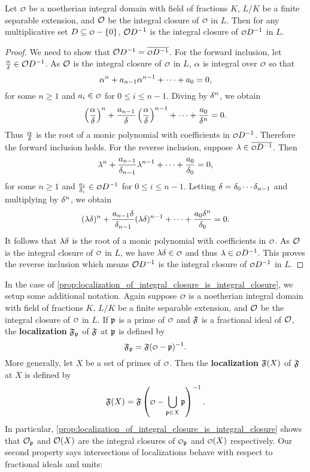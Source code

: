     \begin{proposition}\label{prop:localization_of_integral_closure_is_integral_closure}
      Let $\smc{O}$ be a noetherian integral domain with field of fractions $K$, $L/K$ be a finite separable extension, and $\mathcal{O}$ be the integral closure of $\smc{O}$ in $L$. Then for any multiplicative set $D \subseteq \smc{O}-\{0\}$, $\mathcal{O}D^{-1}$ is the integral closure of $\smc{O}D^{-1}$ in $L$.
    \end{proposition}
    \begin{proof}
      We need to show that $\mc{O}D^{-1} = \conj{\smc{O}D^{-1}}$. For the forward inclusion, let $\frac{\alpha}{\delta} \in \mathcal{O}D^{-1}$. As $\mathcal{O}$ is the integral closure of $\smc{O}$ in $L$, $\alpha$ is integral over $\smc{O}$ so that
      \[
        \alpha^{n}+a_{n-1}\alpha^{n-1}+\cdots+a_{0} = 0,
      \]
      for some $n \ge 1$ and $a_{i} \in \smc{O}$ for $0 \le i \le n-1$. Diving by $\delta^{n}$, we obtain
      \[
        \left(\frac{\alpha}{\delta}\right)^{n}+\frac{a_{n-1}}{\delta}\left(\frac{\alpha}{\delta}\right)^{n-1}+\cdots+\frac{a_{0}}{\delta^{n}} = 0.
      \]
      Thus $\frac{\alpha}{\delta}$ is the root of a monic polynomial with coefficients in $\smc{O}D^{-1}$. Therefore the forward inclusion holds. For the reverse inclusion, suppose $\l \in \conj{\smc{O}D^{-1}}$. Then
      \[
        \lambda^{n}+\frac{a_{n-1}}{\delta_{n-1}}\lambda^{n-1}+\cdots+\frac{a_{0}}{\delta_{0}} = 0,
      \]
      for some $n \ge 1$ and $\frac{a_{i}}{\d_{i}} \in \smc{O}D^{-1}$ for $0 \le i \le n-1$. Letting $\delta = \delta_{0}\cdots\delta_{n-1}$ and multiplying by $\delta^{n}$, we obtain
      \[
        (\lambda\delta)^{n}+\frac{a_{n-1}\delta}{\delta_{n-1}}(\lambda\delta)^{n-1}+\cdots+\frac{a_{0}\delta^{n}}{\delta_{0}} = 0.
      \]
      It follows that $\lambda\delta$ is the root of a monic polynomial with coefficients in $\smc{O}$. As $\mathcal{O}$ is the integral closure of $\smc{O}$ in $L$, we have $\l\d \in \smc{O}$ and thus $\l \in \smc{O}D^{-1}$. This proves the reverse inclusion which means $\mathcal{O}D^{-1}$ is the integral closure of $\smc{O}D^{-1}$ in $L$.
    \end{proof}

    In the case of \cref{prop:localization_of_integral_closure_is_integral_closure}, we setup some additional notation. Again suppose $\smc{O}$ is a noetherian integral domain with field of fractions $K$, $L/K$ be a finite separable extension, and $\mathcal{O}$ be the integral closure of $\smc{O}$ in $L$. If $\mathfrak{p}$ is a prime of $\smc{O}$ and $\mathfrak{F}$ is a fractional ideal of $\mathcal{O}$, the \textbf{localization} $\mathfrak{F}_{\mathfrak{p}}$ of $\mathfrak{F}$ at $\mathfrak{p}$ is defined by
    \[
      \mf{F}_{\mf{p}} = \mf{F}(\smc{O}-\mf{p})^{-1}.
    \]
    More generally, let $X$ be a set of primes of $\smc{O}$. Then the \textbf{localization} $\mathfrak{F}(X)$ of $\mathfrak{F}$ at $X$ is defined by
    \[
      \mf{F}(X) = \mf{F}\left(\smc{O}-\bigcup_{\mf{p} \in X}\mf{p}\right)^{-1}.
    \]
    In particular, \cref{prop:localization_of_integral_closure_is_integral_closure} shows that $\mathcal{O}_{\mathfrak{p}}$ and $\mathcal{O}(X)$ are the integral closures of $\smc{O}_{\mf{p}}$ and $\smc{O}(X)$ respectively. Our second property says intersections of localizations behave with respect to fractional ideals and units:

